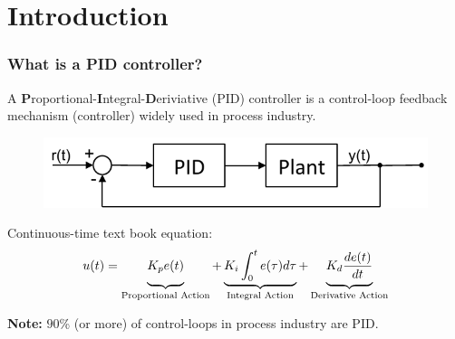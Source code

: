 
\section{Introduction}

\begin{frame}
	\frametitle{What is a PID controller?}
	\small{
	\begin{definition}
		A \textbf{P}roportional-\textbf{I}ntegral-\textbf{D}eriviative (PID) controller is a control-loop feedback mechanism (controller) widely used in process industry.
		\begin{figure}
			\centering
			\includegraphics[width=0.8\linewidth]{PID_figure}
		\end{figure}
		\vspace{-1em}
		Continuous-time text book equation:
		\begin{equation*}
			u(t) = 	\underbrace{\vphantom{\int^t_0e(\tau)d\tau}K_p e(t)}_\text{Proportional Action} 
					+ \underbrace{K_i\int^t_0e(\tau)d\tau}_\text{Integral Action} 
					+ \underbrace{\vphantom{\int^t_0e(\tau)d\tau} K_d \frac{de(t)}{dt}}_\text{Derivative Action}
		\end{equation*}
		\vspace{-1.5em}
	\end{definition}
	
	\textbf{Note:} $90$\% (or more) of control-loops in process industry are PID.\\ 
}
\end{frame}

